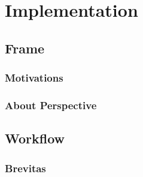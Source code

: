 \chapter{Implementation} %

\label{Chapter5} %



\section{Frame}


\subsection{Motivations}


\subsection{About Perspective}


\section{Workflow}


\subsection{Brevitas}


